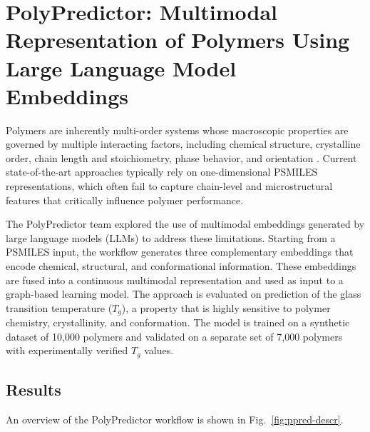 




\section{\textbf{PolyPredictor}: Multimodal Representation of Polymers Using Large Language Model Embeddings}

%
%

Polymers are inherently multi-order systems whose macroscopic properties are governed by multiple interacting factors, including chemical structure, crystalline order, chain length and stoichiometry, phase behavior, and orientation \cite{D3PY00395G}. Current state-of-the-art approaches typically rely on one-dimensional PSMILES representations, which often fail to capture chain-level and microstructural features that critically influence polymer performance.  

The PolyPredictor team explored the use of multimodal embeddings generated by large language models (LLMs) to address these limitations. Starting from a PSMILES input, the workflow generates three complementary embeddings that encode chemical, structural, and conformational information. These embeddings are fused into a continuous multimodal representation and used as input to a graph-based learning model. The approach is evaluated on prediction of the glass transition temperature ($T_g$), a property that is highly sensitive to polymer chemistry, crystallinity, and conformation. The model is trained on a synthetic dataset of 10,000 polymers and validated on a separate set of 7,000 polymers with experimentally verified $T_g$ values.

\subsection*{Results}
An overview of the PolyPredictor workflow is shown in Fig.~\ref{fig:ppred-descr}.

